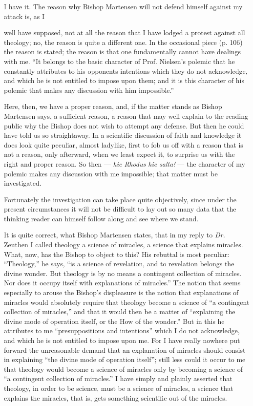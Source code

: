 \documentclass[12pt]{book}
\newcommand{\opage}[1]{\marginnote{\footnotesize\textit{[#1]}}}
\begin{document}
I have it. The reason why Bishop Martensen will not defend himself against my attack is, as I

\opage{81}\setcounter{footnote}{0}%
well have supposed, not at all the reason that I have lodged a protest against all theology; no, the reason is quite a different one. In the occasional piece (p. 106) the reason is stated; the reason is that one fundamentally cannot have dealings with me. ``It belongs to the basic character of Prof. Nielsen's polemic that he constantly attributes to his opponents intentions which they do not acknowledge, and which he is not entitled to impose upon them; and it is this character of his polemic that makes any discussion with him impossible.''

Here, then, we have a proper reason, and, if the matter stands as Bishop Martensen says, a sufficient reason, a reason that may well explain to the reading public why the Bishop does not wish to attempt any defense. But then he could have told us so straightaway. In a scientific discussion of faith and knowledge it does look quite peculiar, almost ladylike, first to fob us off with a reason that is not a reason, only afterward, when we least expect it, to surprise us with the right and proper reason. So then --- \textit{hic Rhodus hic salta!} --- the character of my polemic makes any discussion with me impossible; that matter must be investigated.

Fortunately the investigation can take place quite objectively, since under the present circumstances it will not be difficult to lay out so many data that the thinking reader can himself follow along and see where we stand.

It is quite correct, what Bishop Martensen states, that in my reply to \textit{Dr.} Zeuthen I called theology a science of miracles, a science that explains miracles. What, now, has the Bishop to object to this? His rebuttal is most peculiar: ``Theology,'' he says, ``is a science of revelation, and to revelation belongs the divine wonder. But theology is by no means a contingent collection of miracles. Nor does it occupy itself with explanations of miracles.'' The notion that seems especially to arouse
\opage{82}\setcounter{footnote}{0}%
the Bishop's displeasure is the notion that explanations of miracles would absolutely require that theology become a science of ``a contingent collection of miracles,'' and that it would then be a matter of ``explaining the divine mode of operation itself, or the How of the wonder.'' But in this he attributes to me ``presuppositions and intentions'' which I do not acknowledge, and which he is not entitled to impose upon me. For I have really nowhere put forward the unreasonable demand that an explanation of miracles should consist in explaining ``the divine mode of operation itself''; still less could it occur to me that theology would become a science of miracles only by becoming a science of ``a contingent collection of miracles.'' I have simply and plainly asserted that theology, in order to be science, must be a science of miracles, a science that explains the miracles, that is, gets something scientific out of the miracles.
\end{document}
